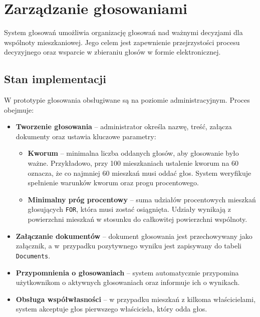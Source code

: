 \section{Zarządzanie głosowaniami}
System głosowań umożliwia organizację głosowań nad ważnymi decyzjami dla wspólnoty mieszkaniowej. Jego celem jest zapewnienie przejrzystości procesu decyzyjnego oraz wsparcie w zbieraniu głosów w formie elektronicznej.
\subsection{Stan implementacji}
W  prototypie głosowania obsługiwane są na poziomie administracyjnym. Proces obejmuje:
\begin{itemize}
    \item \textbf{Tworzenie głosowania} -- administrator określa nazwę, treść, załącza dokumenty oraz ustawia kluczowe parametry:
        \begin{itemize}
            \item \textbf{Kworum} -- minimalna liczba oddanych głosów, aby głosowanie było ważne. Przykładowo, przy 100 mieszkaniach ustalenie kworum na 60 oznacza, że co najmniej 60 mieszkań musi oddać głos. System weryfikuje spełnienie warunków kworum oraz progu procentowego.
            \item \textbf{Minimalny próg procentowy} -- suma udziałów procentowych mieszkań głosujących \texttt{FOR}, która musi zostać osiągnięta. Udziały wynikają z powierzchni mieszkań w stosunku do całkowitej powierzchni wspólnoty.
        \end{itemize}
    \item \textbf{Załączanie dokumentów} -- dokument głosowania jest przechowywany jako załącznik, a w~przypadku pozytywnego wyniku jest zapisywany do tabeli \texttt{Documents}.
    \item \textbf{Przypomnienia o głosowaniach} -- system automatycznie przypomina użytkownikom o aktywnych głosowaniach oraz informuje ich o wynikach.
    \item \textbf{Obsługa współwłasności} -- w przypadku mieszkań z kilkoma właścicielami, system akceptuje głos pierwszego właściciela, który odda głos.
\end{itemize}

